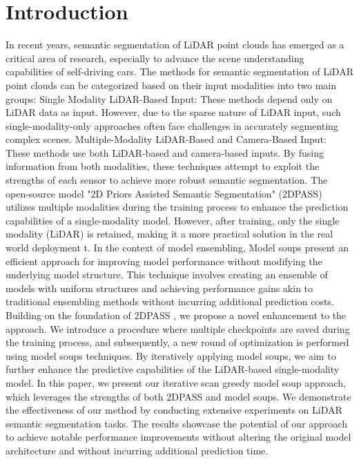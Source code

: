 \documentclass[10pt,twocolumn,letterpaper]{article}
\begin{document}
\section{Introduction}
\label{sec:intro}
In recent years, semantic segmentation of LiDAR point clouds has emerged as a critical area of research, especially to advance the scene understanding capabilities of self-driving cars.\cite{hu2019randla,yan2021sparse, SparseConv} The methods for semantic segmentation of LiDAR point clouds can be categorized based on their input modalities into two main groups:
Single Modality LiDAR-Based Input: These methods depend only on LiDAR data as input. However, due to the sparse nature of LiDAR input, such single-modality-only approaches often face challenges in accurately segmenting complex scenes.\cite{chen2017deeplab,chen2017rethinking,song2017semantic,huang2019ccnet,yan2021sparse,xu2020squeezesegv3,zhu2021cylindrical,tang2020searching,zheng2022beyond,zheng2021box}
Multiple-Modality LiDAR-Based and Camera-Based Input: These methods use both LiDAR-based and camera-based inputs. By fusing information from both modalities, these techniques attempt to exploit the strengths of each sensor to achieve more robust semantic segmentation.\cite{zhuang2021perception,el2019rgb,vora2020pointpainting}
The open-source model "2D Priors Assisted Semantic Segmentation" (2DPASS)\cite{yan20222dpass} utilizes multiple modalities during the training process to enhance the prediction capabilities of a single-modality model. However, after training, only the single modality (LiDAR) is retained, making it a more practical solution in the real world deployment t.
In the context of model ensembling, Model soups present an efficient approach for improving model performance without modifying the underlying model structure. This technique involves creating an ensemble of models with uniform structures and achieving performance gains akin to traditional ensembling methods without incurring additional prediction costs.
Building on the foundation of 2DPASS \cite{yan20222dpass}, we propose a novel enhancement to the approach. We introduce a procedure where multiple checkpoints are saved during the training process, and subsequently, a new round of optimization is performed using model soups techniques. By iteratively applying model soups, we aim to further enhance the predictive capabilities of the LiDAR-based single-modality model.
In this paper, we present our iterative scan greedy model soup approach, which leverages the strengths of both 2DPASS \cite{yan20222dpass} and model soups. We demonstrate the effectiveness of our method by conducting extensive experiments on LiDAR semantic segmentation tasks. The results showcase the potential of our approach to achieve notable performance improvements without altering the original model architecture and without incurring additional prediction time.
\end{document}
